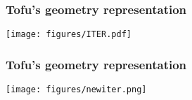 \documentclass[10pt]{beamer}
\begin{document}
\begin{frame}
\frametitle{Tofu's geometry representation}

\begin{center}
    	\texttt{[image: figures/ITER.pdf]}
\end{center}
	
\end{frame}

\begin{frame}
\frametitle{Tofu's geometry representation}

\begin{center}
    	\texttt{[image: figures/newiter.png]}
\end{center}
	
\end{frame}


%
%
\end{document}
